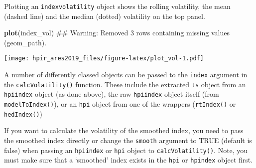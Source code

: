 \documentclass[]{article}
\newenvironment{Shaded}{\begin{snugshade}}{\end{snugshade}}
\newcommand{\CommentTok}[1]{\textcolor[rgb]{0.56,0.35,0.01}{\textit{#1}}}
\newcommand{\DataTypeTok}[1]{\textcolor[rgb]{0.13,0.29,0.53}{#1}}
\newcommand{\DecValTok}[1]{\textcolor[rgb]{0.00,0.00,0.81}{#1}}
\newcommand{\KeywordTok}[1]{\textcolor[rgb]{0.13,0.29,0.53}{\textbf{#1}}}
\newcommand{\NormalTok}[1]{#1}
\newcommand{\OperatorTok}[1]{\textcolor[rgb]{0.81,0.36,0.00}{\textbf{#1}}}
\newcommand{\StringTok}[1]{\textcolor[rgb]{0.31,0.60,0.02}{#1}}
\begin{document}
\begin{Shaded}
\end{Shaded}

Plotting an \texttt{indexvolatility} object shows the rolling
volatility, the mean (dashed line) and the median (dotted) volatility on
the top panel.

\begin{Shaded}
\begin{Highlighting}[]
  \KeywordTok{plot}\NormalTok{(index_vol)}
\NormalTok{## Warning: Removed 3 rows containing missing values (geom_path).}
\end{Highlighting}
\end{Shaded}

\texttt{[image: hpir\_ares2019\_files/figure-latex/plot\_vol-1.pdf]}

A number of differently classed objects can be passed to the
\texttt{index} argument in the \texttt{calcVolatility()} function. These
include the extracted \texttt{ts} object from an \texttt{hpiindex}
object (as done above), the raw \texttt{hpiindex} object itself (from
\texttt{modelToIndex()}), or an \texttt{hpi} object from one of the
wrappers (\texttt{rtIndex()} or \texttt{hedIndex()})

\begin{Shaded}
\end{Shaded}

If you want to calculate the volatility of the smoothed index, you need
to pass the smoothed index directly or change the \texttt{smooth}
argument to TRUE (default is false) when passing an \texttt{hpiindex} or
\texttt{hpi} object to \texttt{calcVolatility()}. Note, you must make
sure that a `smoothed' index exists in the \texttt{hpi} or
\texttt{hpindex} object first.
\end{document}
